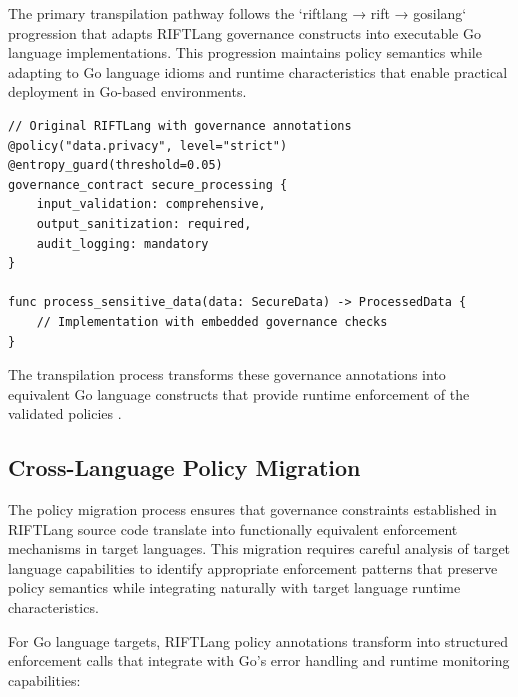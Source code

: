 The primary transpilation pathway follows the `riftlang → rift → gosilang` progression that adapts RIFTLang governance constructs into executable Go language implementations. This progression maintains policy semantics while adapting to Go language idioms and runtime characteristics that enable practical deployment in Go-based environments.

\begin{lstlisting}[style=riftlang, language=rift]
// Original RIFTLang with governance annotations
@policy("data.privacy", level="strict")
@entropy_guard(threshold=0.05)
governance_contract secure_processing {
    input_validation: comprehensive,
    output_sanitization: required,
    audit_logging: mandatory
}

func process_sensitive_data(data: SecureData) -> ProcessedData {
    // Implementation with embedded governance checks
}
\end{lstlisting}

The transpilation process transforms these governance annotations into equivalent Go language constructs that provide runtime enforcement of the validated policies \cite{TODO:rift-transpiler-interop}.

\subsection{Cross-Language Policy Migration}

The policy migration process ensures that governance constraints established in RIFTLang source code translate into functionally equivalent enforcement mechanisms in target languages. This migration requires careful analysis of target language capabilities to identify appropriate enforcement patterns that preserve policy semantics while integrating naturally with target language runtime characteristics.

For Go language targets, RIFTLang policy annotations transform into structured enforcement calls that integrate with Go's error handling and runtime monitoring capabilities:

